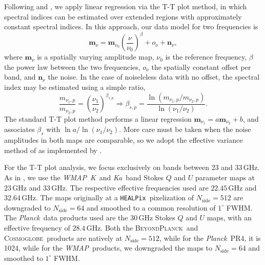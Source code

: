 \documentclass[twocolumn]{../../common/aa}
\def\WMAP{\emph{WMAP}}
\def\Planck{\emph{Planck}}
\def\healpix{\texttt{HEALPix}}
\newcommand{\bp}{\textsc{BeyondPlanck}}
\newcommand{\cosmoglobe}{\textsc{Cosmoglobe}}
\newcommand{\K}[0]{\textit K}
\newcommand{\Ka}[0]{\textit{Ka}}
\begin{document}
Following \citet{fuskeland2014} and \citet{fuskeland:2019}, we apply linear regression via the T-T plot method, in which spectral indices can be estimated over extended regions with approximately constant spectral indices. In this approach, our data model for two frequencies is
\begin{equation}
	\boldsymbol m_\nu = \boldsymbol m_{\nu_0}\left(\frac\nu{\nu_0}\right)^\beta+o_\nu+\boldsymbol n_\nu ,
\end{equation}
where $\boldsymbol m_\nu$ is a spatially varying amplitude map, $\nu_0$ is the reference frequency, $\beta$ the power law between the two frequencies, $o_\nu$ the spatially constant offset per band, and $\boldsymbol n_\nu$ the noise.  In the case of noiseleless data with no offset, the spectral index may be estimated using a simple ratio,
\begin{equation}
	\frac{m_{\nu_1,p}}{m_{\nu_2,p}}
	=\left(\frac{\nu_1}{\nu_2}\right)^{\beta_{s,p}}
	\Rightarrow
	\beta_{s,p}=\frac{\ln(m_{\nu_1,p}/m_{\nu_2,p})}{\ln(\nu_1/\nu_2)}.
\end{equation}
The standard T-T plot method performs a linear regression $\boldsymbol m_{\nu_1}=a\boldsymbol m_{\nu_2}+b$, and associates $\beta_s$ with $\ln a/\ln(\nu_1/\nu_2)$. More care must be taken when the noise amplitudes in both maps are comparable, so we adopt the effective variance method of \citet{orear1982} as implemented by \citet{fuskeland2014}.

For the T-T plot  analysis, we focus exclusively on bands between 23 and 33\,GHz. As in \citet{fuskeland2014}, we use the \WMAP\ \K\ and \Ka\ band Stokes $Q$ and $U$ parameter maps at $23$\,GHz and $33$\,GHz. The respective effective frequencies used are $22.45$\,GHz and $32.64$\,GHz. The maps originally at a \healpix\ pixelization of $N_\textrm{side}=512$ are downgraded to $N_\textrm{side}=64$ and smoothed to a common resolution of $1^\circ$ FWHM.
The \Planck\ data products used are the $30$\,GHz Stokes $Q$ and $U$ maps, with an effective frequency of $28.4$\,GHz. Both the \bp\ and \cosmoglobe\ products are natively at $N_\textrm{side}=512$, while for the \Planck\ PR4, it is 1024, while for the \WMAP\ products, we downgraded the maps to $N_\textrm{side}=64$ and smoothed to $1^\circ$ FWHM.  
\end{document}
